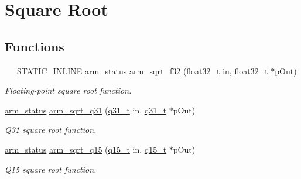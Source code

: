 \hypertarget{group___s_q_r_t}{\section{Square Root}
\label{group___s_q_r_t}
}
\subsection*{Functions}
\begin{DoxyCompactItemize}
\item 
\-\_\-\-\_\-\-S\-T\-A\-T\-I\-C\-\_\-\-I\-N\-L\-I\-N\-E \hyperlink{arm__math_8h_a5e459c6409dfcd2927bb8a57491d7cf6}{arm\-\_\-status} \hyperlink{group___s_q_r_t_gad8d530e02516dcf4bc724c7f7e173eb9}{arm\-\_\-sqrt\-\_\-f32} (\hyperlink{arm__math_8h_a4611b605e45ab401f02cab15c5e38715}{float32\-\_\-t} in, \hyperlink{arm__math_8h_a4611b605e45ab401f02cab15c5e38715}{float32\-\_\-t} $\ast$p\-Out)
\begin{DoxyCompactList}\small\item\em Floating-\/point square root function. \end{DoxyCompactList}\item 
\hyperlink{arm__math_8h_a5e459c6409dfcd2927bb8a57491d7cf6}{arm\-\_\-status} \hyperlink{group___s_q_r_t_ga119e25831e141d734d7ef10636670058}{arm\-\_\-sqrt\-\_\-q31} (\hyperlink{arm__math_8h_adc89a3547f5324b7b3b95adec3806bc0}{q31\-\_\-t} in, \hyperlink{arm__math_8h_adc89a3547f5324b7b3b95adec3806bc0}{q31\-\_\-t} $\ast$p\-Out)
\begin{DoxyCompactList}\small\item\em Q31 square root function. \end{DoxyCompactList}\item 
\hyperlink{arm__math_8h_a5e459c6409dfcd2927bb8a57491d7cf6}{arm\-\_\-status} \hyperlink{group___s_q_r_t_ga5abe5ca724f3e15849662b03752c1238}{arm\-\_\-sqrt\-\_\-q15} (\hyperlink{arm__math_8h_ab5a8fb21a5b3b983d5f54f31614052ea}{q15\-\_\-t} in, \hyperlink{arm__math_8h_ab5a8fb21a5b3b983d5f54f31614052ea}{q15\-\_\-t} $\ast$p\-Out)
\begin{DoxyCompactList}\small\item\em Q15 square root function. \end{DoxyCompactList}\end{DoxyCompactItemize}


